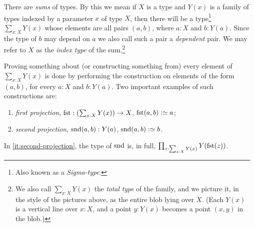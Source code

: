 There are \emph{sums} of types.
By this we mean if $X$ is a type and $Y(x)$ is a family of types indexed by a parameter $x$ of type $X$, then
there will be a type\footnote{%
  Also known as a \emph{Sigma-type}.}
$\sum _{x:X} Y(x)$ whose elements are all pairs $(a,b)$, where $a:X$ and $b:Y(a)$. Since the type of $b$ may depend on $a$ we also call such a pair
a \emph{dependent} pair. We may refer to $X$ as the \emph{index
  type} of the sum.\footnote{%
  We also call $\sum_{x:X}Y(x)$ the \emph{total type} of the family,
  and we picture it, in the style of the pictures above,
  as the entire blob lying over $X$. (Each $Y(x)$ is a vertical line over $x:X$,
  and a point $y:Y(x)$ becomes a point $(x,y)$ in the blob.)\par
  }

Proving something about (or constructing something from) every 
element of $\sum _{x:X} Y(x)$ is done by performing the construction on elements of the form $(a,b)$, for every $a:X$ and $b: Y(a)$.
Two important examples of such constructions are:
\begin{enumerate}
\item \emph{first projection}, 
$\fst:(\sum _{x:X} Y(x)) \to X$, 
$\fst(a,b)\defeq a$;
\item\label{it:second-projection} \emph{second projection},
$\snd(a,b): Y(a)$,
$\snd(a,b)\defeq b$.
\end{enumerate}
In \ref{it:second-projection}, the type of $\snd$ is, in full,
$\prod_{z:\sum_{x:X} Y(x)} Y(\fst(z))$.

